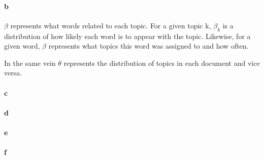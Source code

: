 \documentclass{article}
\begin{document}
\paragraph{b}

$\beta$ represents what words related to each topic. For a given topic k,
$\beta_k$ is a distribution of how likely each word is to appear with the
topic. Likewise, for a given word, $\beta$ represents what topics this word was
assigned to and how often.

In the same vein $\theta$ represents the distribution of topics in each
document and vice versa.

\paragraph{c}
\paragraph{d}
\paragraph{e}
\paragraph{f}
\end{document}
